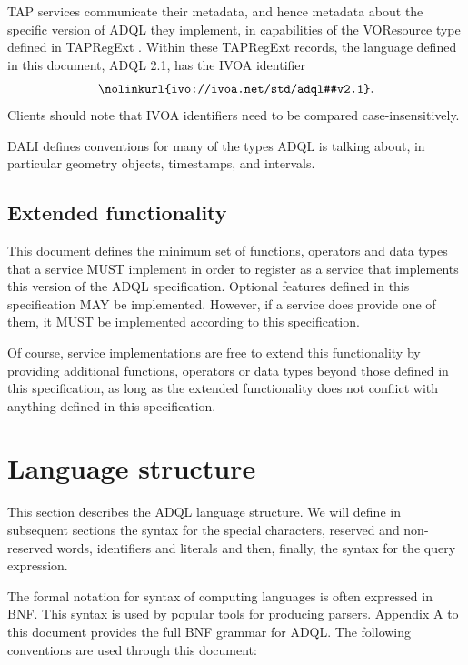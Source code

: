 \documentclass[11pt,a4paper]{ivoa}
\begin{document}
TAP services communicate their metadata, and hence metadata about the
specific version of ADQL they implement, in capabilities of the
VOResource type  defined in TAPRegExt
\citep{2012ivoa.spec.0827D}.  Within these TAPRegExt records, the
language defined in this document, ADQL 2.1, has the IVOA identifier $$
\hbox{\nolinkurl{ivo://ivoa.net/std/adql#v2.1}}.$$ Clients should note
that IVOA identifiers need to be compared case-insensitively.

DALI \citep{2017ivoa.spec.0517D} defines conventions for many of the
types ADQL is talking about, in particular geometry objects, timestamps,
and intervals.

\subsection{Extended functionality}
\label{sec:extending}

This document defines the minimum set of functions, operators and data types
that a service MUST implement in order to register as a service that
implements this version of the ADQL specification. Optional features defined in
this specification MAY be implemented. However, if a service does provide one of
them, it MUST be implemented according to this specification.

Of course, service implementations are free to extend this functionality by
providing additional functions, operators or data types beyond those defined in
this specification, as long as the extended functionality does not conflict
with anything defined in this specification.

\clearpage %
\section{Language structure}
\label{sec:language}

This section describes the ADQL language structure. We will define in
subsequent sections the syntax for the special characters, reserved and non-
reserved words, identifiers and literals and then, finally, the syntax for
the query expression.

The formal notation for syntax of computing languages is often expressed
in BNF. This syntax is used by popular tools for
producing parsers. Appendix A to this document provides the full BNF grammar
for ADQL. The following conventions are used through this document:
\end{document}
